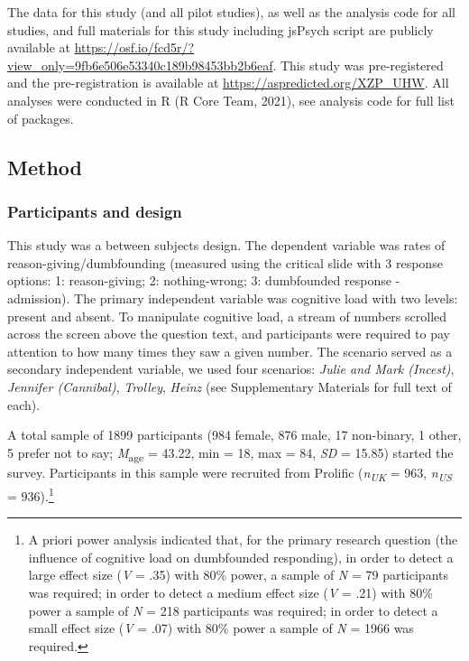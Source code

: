 \documentclass[
  man,floatsintext]{apa6}
\begin{document}
The data for this study (and all pilot studies), as well as the analysis code for all studies, and full materials for this study including jsPsych script are publicly available at \color{blue}\url{https://osf.io/fcd5r/?view_only=9fb6e506e53340c189b98453bb2b6eaf}\color{black}. This study was pre-registered and the pre-registration is available at \color{blue}\url{https://aspredicted.org/XZP_UHW}\color{black}. All analyses were conducted in R (R Core Team, 2021), see analysis code for full list of packages.

\hypertarget{method}{%
\subsection{Method}\label{method}}

\hypertarget{participants-and-design}{%
\subsubsection{Participants and design}\label{participants-and-design}}

This study was a between subjects design. The dependent variable was rates of reason-giving/dumbfounding (measured using the critical slide with 3 response options: 1: reason-giving; 2: nothing-wrong; 3: dumbfounded response - admission). The primary independent variable was cognitive load with two levels: present and absent. To manipulate cognitive load, a stream of numbers scrolled across the screen above the question text, and participants were required to pay attention to how many times they saw a given number. The scenario served as a secondary independent variable, we used four scenarios: \emph{Julie and Mark (Incest)}, \emph{Jennifer (Cannibal)}, \emph{Trolley}, \emph{Heinz} (see Supplementary Materials for full text of each).

A total sample of 1899 participants (984 female, 876 male, 17 non-binary, 1 other, 5 prefer not to say; \emph{M}\textsubscript{age} = 43.22, min = 18, max = 84, \emph{SD} = 15.85) started the survey. Participants in this sample were recruited from Prolific (\emph{n\textsubscript{UK}} = 963, \emph{n\textsubscript{US}} = 936).\footnote{A priori power analysis indicated that, for the primary research question (the influence of cognitive load on dumbfounded responding), in order to detect a large effect size (\emph{V} = .35) with 80\% power, a sample of \emph{N} = 79 participants was required; in order to detect a medium effect size (\emph{V} = .21) with 80\% power a sample of \emph{N} = 218 participants was required; in order to detect a small effect size (\emph{V} = .07) with 80\% power a sample of \emph{N} = 1966 was required.}
\end{document}
